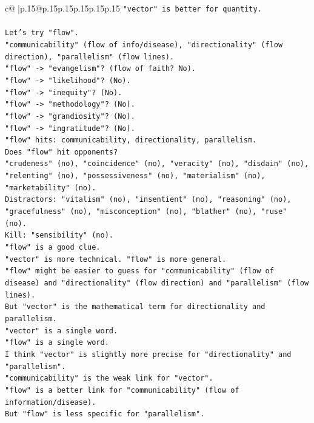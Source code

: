 \documentclass{article}
\begin{document}
{\begin{supertabular}{c@{$\;$}|p{.15\linewidth}@{}p{.15\linewidth}p{.15\linewidth}p{.15\linewidth}p{.15\linewidth}p{.15\linewidth}}
{{{\texttt{"vector" is better for quantity.} \\
\\ 
\texttt{Let's try "flow".} \\
\texttt{"communicability" (flow of info/disease), "directionality" (flow direction), "parallelism" (flow lines).} \\
\texttt{"flow" {-}> "evangelism"? (flow of faith? No).} \\
\texttt{"flow" {-}> "likelihood"? (No).} \\
\texttt{"flow" {-}> "inequity"? (No).} \\
\texttt{"flow" {-}> "methodology"? (No).} \\
\texttt{"flow" {-}> "grandiosity"? (No).} \\
\texttt{"flow" {-}> "ingratitude"? (No).} \\
\texttt{"flow" hits: communicability, directionality, parallelism.} \\
\texttt{Does "flow" hit opponents?} \\
\texttt{"crudeness" (no), "coincidence" (no), "veracity" (no), "disdain" (no), "relenting" (no), "possessiveness" (no), "materialism" (no), "marketability" (no).} \\
\texttt{Distractors: "vitalism" (no), "insentient" (no), "reasoning" (no), "gracefulness" (no), "misconception" (no), "blather" (no), "ruse" (no).} \\
\texttt{Kill: "sensibility" (no).} \\
\texttt{"flow" is a good clue.} \\
\texttt{"vector" is more technical. "flow" is more general.} \\
\texttt{"flow" might be easier to guess for "communicability" (flow of disease) and "directionality" (flow direction) and "parallelism" (flow lines).} \\
\texttt{But "vector" is the mathematical term for directionality and parallelism.} \\
\texttt{"vector" is a single word.} \\
\texttt{"flow" is a single word.} \\
\texttt{I think "vector" is slightly more precise for "directionality" and "parallelism".} \\
\texttt{"communicability" is the weak link for "vector".} \\
\texttt{"flow" is a better link for "communicability" (flow of information/disease).} \\
\texttt{But "flow" is less specific for "parallelism".} \\
}}}
\end{supertabular}}
\end{document}
